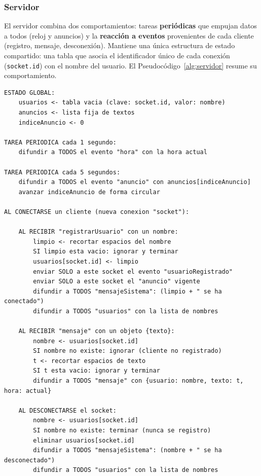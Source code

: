 \documentclass[12pt,a4paper]{article}
\begin{document}
\subsubsection{Servidor}

El servidor combina dos comportamientos: tareas \textbf{periódicas} que empujan datos a todos (reloj y anuncios) y la \textbf{reacción a eventos} provenientes de cada cliente (registro, mensaje, desconexión). Mantiene una única estructura de estado compartido: una tabla que asocia el identificador único de cada conexión (\texttt{socket.id}) con el nombre del usuario. El Pseudocódigo~\ref{alg:servidor} resume su comportamiento.

\begin{lstlisting}[caption={Pseudocódigo del comportamiento del servidor.}, label={alg:servidor}]
ESTADO GLOBAL:
    usuarios <- tabla vacia (clave: socket.id, valor: nombre)
    anuncios <- lista fija de textos
    indiceAnuncio <- 0

TAREA PERIODICA cada 1 segundo:
    difundir a TODOS el evento "hora" con la hora actual

TAREA PERIODICA cada 5 segundos:
    difundir a TODOS el evento "anuncio" con anuncios[indiceAnuncio]
    avanzar indiceAnuncio de forma circular

AL CONECTARSE un cliente (nueva conexion "socket"):

    AL RECIBIR "registrarUsuario" con un nombre:
        limpio <- recortar espacios del nombre
        SI limpio esta vacio: ignorar y terminar
        usuarios[socket.id] <- limpio
        enviar SOLO a este socket el evento "usuarioRegistrado"
        enviar SOLO a este socket el "anuncio" vigente
        difundir a TODOS "mensajeSistema": (limpio + " se ha conectado")
        difundir a TODOS "usuarios" con la lista de nombres

    AL RECIBIR "mensaje" con un objeto {texto}:
        nombre <- usuarios[socket.id]
        SI nombre no existe: ignorar (cliente no registrado)
        t <- recortar espacios de texto
        SI t esta vacio: ignorar y terminar
        difundir a TODOS "mensaje" con {usuario: nombre, texto: t, hora: actual}

    AL DESCONECTARSE el socket:
        nombre <- usuarios[socket.id]
        SI nombre no existe: terminar (nunca se registro)
        eliminar usuarios[socket.id]
        difundir a TODOS "mensajeSistema": (nombre + " se ha desconectado")
        difundir a TODOS "usuarios" con la lista de nombres
\end{lstlisting}
\end{document}
